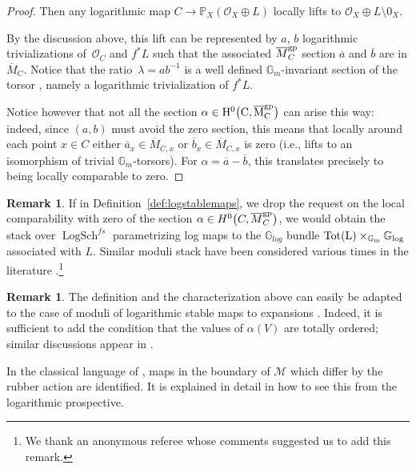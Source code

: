 \documentclass[11pt]{article}
\numberwithin{equation}{section}
\newcommand{\M}{\mathcal{M}}
\renewcommand{\O}{\mathcal{O}}
\renewcommand{\bar}{\overline}
\numberwithin{equation}{section}
\theoremstyle{definition}
\newtheorem{remarkk}[theo]{Remark}
\begin{document}
\begin{proof}
Then any logarithmic map $C\to \mathbb P_X(\mathcal O_X\oplus L)$ locally lifts to $\O_X\oplus L\setminus 0_X$.

By the discussion above, this lift can be represented by $a$, $b$ logarithmic trivializations of~$\mathcal O_C$ and $f^*L$ such that the associated $\bar{M}_C^{\rm gp}$ section $\bar{a}$ and $\bar{b}$ are in $\bar{M}_C$. Notice that the ratio~${\lambda=ab^{-1}}$ is a well defined $\mathbb G_m$-invariant section of the torsor , namely a logarithmic trivialization of $f^*L$.

Notice however that not all the section $\alpha\in \rm{H}^0\bigl(C,\bar{M}_{C}^{\rm gp}\bigr)$ can arise this way: indeed, since $(a,b)$ must avoid the zero section, this means that locally around each point $x\in C$ either $\bar{a}_x\in \bar{M}_{C,x} $ or $\bar{b}_x\in\bar{M}_{C,x}$ is zero (i.e., lifts to an isomorphism of trivial $\mathbb G_m$-torsors). For $\alpha=\bar{a}-\bar{b}$, this translates precisely to being locally comparable to zero.
\end{proof}

\begin{remarkk}
If in Definition~\ref{def:logstablemaps}, we drop the request on the local comparability with zero of the section $\alpha\in H^0\bigl(C,\bar{M}_C^{\rm gp}\bigr)$, we would obtain the stack over $\operatorname{LogSch}^{fs}$ parametrizing log maps to the $\mathbb G_{log}$ bundle $\rm{Tot}(L)\times_{\mathbb G_m}\mathbb G_{log}$ associated with $L$. Similar moduli stack have been considered various times in the literature \cite{marcuswiselog,ranganathan2024logarithmic,RSPW2,ranganathan2020rational}.\footnote{We thank an anonymous referee whose comments suggested us to add this remark.}
\end{remarkk}

\begin{remarkk}
The definition and the characterization above can easily be adapted to the case of moduli of logarithmic stable maps to expansions \cite{kim2010logarithmic,li2001stable,maulik2023logarithmic}. Indeed, it is sufficient to add the condition that the values of $\alpha(V)$ are totally ordered; similar discussions appear in \cite{marcuswiselog,ranganathan2024logarithmic}.

In the classical language of \cite{li2001stable}, maps in the boundary of $\M$ which differ by the rubber action are identified. It is explained in detail in \cite{CN} how to see this from the logarithmic prospective.
\end{remarkk}
\end{document}
